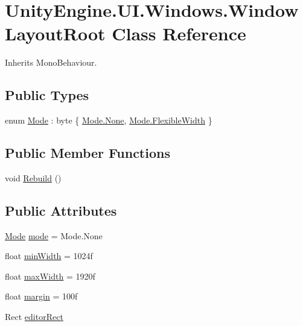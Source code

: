 \hypertarget{class_unity_engine_1_1_u_i_1_1_windows_1_1_window_layout_root}{}\section{Unity\+Engine.\+U\+I.\+Windows.\+Window\+Layout\+Root Class Reference}
\label{class_unity_engine_1_1_u_i_1_1_windows_1_1_window_layout_root}


Inherits Mono\+Behaviour.

\subsection*{Public Types}
\begin{DoxyCompactItemize}
\item 
enum \hyperlink{class_unity_engine_1_1_u_i_1_1_windows_1_1_window_layout_root_a36c316dcd1395b6ae624fef2f948e3d1}{Mode} \+: byte \{ \hyperlink{class_unity_engine_1_1_u_i_1_1_windows_1_1_window_layout_root_a36c316dcd1395b6ae624fef2f948e3d1a6adf97f83acf6453d4a6a4b1070f3754}{Mode.\+None}, 
\hyperlink{class_unity_engine_1_1_u_i_1_1_windows_1_1_window_layout_root_a36c316dcd1395b6ae624fef2f948e3d1aed0ab0b9479c572676b6fc64356275da}{Mode.\+Flexible\+Width}
 \}
\end{DoxyCompactItemize}
\subsection*{Public Member Functions}
\begin{DoxyCompactItemize}
\item 
void \hyperlink{class_unity_engine_1_1_u_i_1_1_windows_1_1_window_layout_root_a397c04efbd7712031d985148c9b8479b}{Rebuild} ()
\end{DoxyCompactItemize}
\subsection*{Public Attributes}
\begin{DoxyCompactItemize}
\item 
\hyperlink{class_unity_engine_1_1_u_i_1_1_windows_1_1_window_layout_root_a36c316dcd1395b6ae624fef2f948e3d1}{Mode} \hyperlink{class_unity_engine_1_1_u_i_1_1_windows_1_1_window_layout_root_a41166775d92d8c71a332da3c859019d6}{mode} = Mode.\+None
\item 
float \hyperlink{class_unity_engine_1_1_u_i_1_1_windows_1_1_window_layout_root_a55622a2438c58fca7bace840bcea3378}{min\+Width} = 1024f
\item 
float \hyperlink{class_unity_engine_1_1_u_i_1_1_windows_1_1_window_layout_root_a653e847a6866be7fbe2e446bc720b6a2}{max\+Width} = 1920f
\item 
float \hyperlink{class_unity_engine_1_1_u_i_1_1_windows_1_1_window_layout_root_ae15a5af99dac9aba2b5cde31cfd25434}{margin} = 100f
\item 
Rect \hyperlink{class_unity_engine_1_1_u_i_1_1_windows_1_1_window_layout_root_a7e20aacd84e71014005229bba80933fa}{editor\+Rect}
\end{DoxyCompactItemize}
